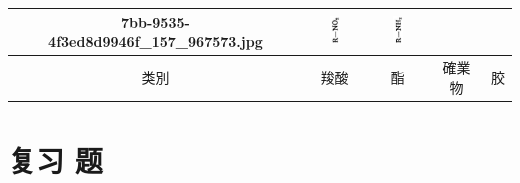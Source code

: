 \documentclass[10pt]{article}
\begin{document}
\begin{center}
{\begin{tabular}{|c|c|c|c|c|}
7bb-9535-4f3ed8d9946f_157_967573.jpg} & \includegraphics[max width=0.2\textwidth]{images/01912d16-be99-77bb-9535-4f3ed8d9946f_157_967574.jpg} & \includegraphics[max width=0.2\textwidth]{images/01912d16-be99-77bb-9535-4f3ed8d9946f_157_967575.jpg} \\
\hline
类別 & 羧酸 & 酯 & 確業物 & 胶 \\
\hline
\end{tabular}
}
\end{center}

\section*{复习 题}
\end{document}
